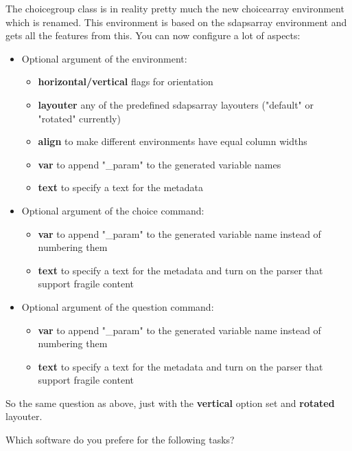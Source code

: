 \documentclass[
  english,
  print_questionnaire_id,
  oneside,
  pagemark,
  stamp]{sdapsclassic}
\begin{document}
\begin{questionnaire}
    The choicegroup class is in reality pretty much the new choicearray environment
    which is renamed. This environment is based on the sdapsarray environment and
    gets all the features from this. You can now configure a lot of aspects:
    \begin{itemize}
      \item Optional argument of the environment:
        \begin{itemize}
          \item {\bfseries horizontal/vertical} flags for orientation
          \item {\bfseries layouter} any of the predefined sdapsarray layouters ("default" or "rotated" currently)
          \item {\bfseries align} to make different environments have equal column widths
          \item {\bfseries var} to append "\_param" to the generated variable names
          \item {\bfseries text} to specify a text for the metadata
        \end{itemize} 
      \item Optional argument of the choice command:
        \begin{itemize}
          \item {\bfseries var} to append "\_param" to the generated variable name instead of numbering them
          \item {\bfseries text} to specify a text for the metadata and turn on the parser that support fragile content
        \end{itemize} 
      \item Optional argument of the question command:
        \begin{itemize}
          \item {\bfseries var} to append "\_param" to the generated variable name instead of numbering them
          \item {\bfseries text} to specify a text for the metadata and turn on the parser that support fragile content
        \end{itemize} 
    \end{itemize} 

    So the same question as above, just with the {\bfseries vertical} option set and {\bfseries rotated} layouter.

    \begin{choicegroup}[vertical,layouter=rotated]{Which software do you prefere for the following tasks?}
      \groupaddchoice[text=LaTeX,var=latex]{\LaTeX}


\end{choicegroup}
\end{questionnaire}
\end{document}
